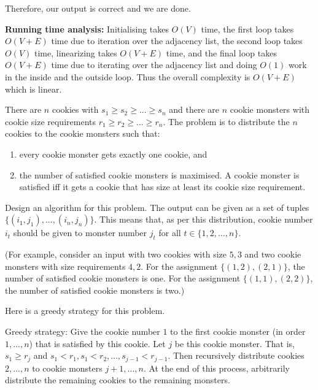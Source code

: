 \documentclass[answers]{exam}
\begin{document}
\begin{questions}
\begin{solution}
Therefore, our output is correct and we are done.

\textbf{Running time analysis:}
Initialising takes $O(V)$ time, the first loop takes $O(V + E)$ time due to iteration over the adjacency list, the second loop takes $O(V)$ time, linearizing takes $O(V + E)$ time, and the final loop
takes $O(V + E)$ time due to iterating over the adjacency list and doing $O(1)$ work in the inside and the outside loop. Thus the overall complexity is $O(V + E)$ which is linear.
\end{solution}

\question[8]

There are $n$ cookies with $s_1 \geq s_2 \geq ... \geq s_n$ and there are $n$ cookie monsters with cookie size requirements $r_1 \geq r_2 \geq ... \geq r_n$. The problem is to distribute the $n$ cookies to the cookie monsters such that:

    \begin{enumerate}
        \item every cookie monster gets exactly one cookie, and
        \item the number of satisfied cookie monsters is maximised. A cookie monster is satisfied iff it gets a cookie that has size at least its cookie size requirement.
    \end{enumerate}

Design an algorithm for this problem. The output can be given as a set of tuples $\{(i_1, j_1), ..., (i_n, j_n)\}$. This means that, as per this distribution, cookie number $i_t$ should be given to
monster number $j_t$ for all $t \in \{1, 2, ..., n\}$.

(For example, consider an input with two cookies with size $5, 3$ and two cookie monsters with size requirements $4, 2$. For the assignment $\{(1, 2), (2, 1)\}$, the number of satisfied cookie
monsters is one. For the assignment $\{(1, 1), (2, 2)\}$, the number of satisfied cookie monsters is two.)

Here is a greedy strategy for this problem.

    Greedy strategy: Give the cookie number $1$ to the first cookie monster (in order $1, ..., n$) that is satisfied by this cookie. Let $j$ be this cookie monster. That is, $s_1 \geq
    r_j$ and $s_1 < r_1, s_1 < r_2, ..., s_{j-1} < r_{j-1}$. Then recursively distribute cookies $2, ..., n$ to cookie monsters $j+1, ..., n$. At the end of this process, arbitrarily distribute the remaining cookies to the remaining monsters.

\begin{parts}

\end{parts}
\end{questions}
\end{document}
